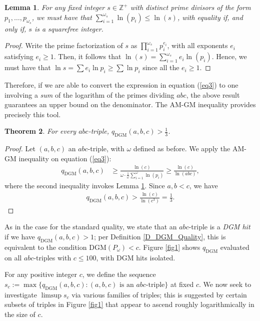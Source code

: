 \documentclass[11pt,letterpaper]{amsart}
\newtheorem{theorem}{Theorem}[section]
\newtheorem{lemma}[theorem]{Lemma}
\def\Z{\mathbb{Z}}
\def\Z{\mathbb{Z}}
\begin{document}
\begin{lemma}\label{L_ln_primes_DGM}
For any fixed integer $s\in\Z^{+}$ with distinct prime divisors of the form $p_1,\dots,p_{\omega_s}$, we must have that
$\sum_{i=1}^{\omega_s}\ln(p_i)\le\ln(s)$, with equality if, and only if, $s$ is a squarefree integer.
\end{lemma}
\begin{proof}
Write the prime factorization of $s$ as $\prod_{i = 1}^{\omega_s} p_i^{e_i}$, with all exponents $e_i$ satisfying $e_i \ge 1$. Then, it follows that $\ln(s) = \sum_{i = 1}^{\omega_s} e_i \ln(p_i)$. Hence, we must have that $\ln s=\sum e_i\ln p_i\ge\sum\ln p_i$ since all the $e_i \ge 1$.
\end{proof}
Therefore, if we are able to convert the expression in equation (\ref{eq3}) to one involving a \textit{sum} of the logarithm of the primes dividing $abc$, the above result guarantees an upper bound on the denominator. The AM-GM inequality provides precisely this tool.
\begin{theorem}\label{T_13}
For every $abc$-triple, $q_{\mathrm{DGM}}(a, b, c) > \tfrac{1}{3}$.
\end{theorem}
\begin{proof}
Let $(a, b, c)$ an $abc$-triple, with $\omega$ defined as before. We apply the AM-GM inequality on equation (\ref{eq3}):
\begin{align*}
q_{\mathrm{DGM}} (a, b, c) &\ge \frac{\ln(c)}{\omega \cdot \frac{1}{\omega} \sum_{i = 1}^{\omega} \ln(p_i)} \ge\frac{\ln(c)}{\ln(abc)},
\end{align*}
where the second inequality invokes Lemma \ref{L_ln_primes_DGM}. Since $a, b < c$, we have 
\begin{align*}
    q_{\mathrm{DGM}} (a, b, c) > \frac{\ln(c)}{\ln(c^3)} = \frac{1}{3}.
\end{align*}
\end{proof}

As in the case for the standard quality, we state that an $abc$-triple is a \textit{DGM hit} if we have $q_{\text{DGM}}(a, b, c) > 1$; per Definition \ref{D_DGM_Quality}, this is equivalent to the condition $\mathrm{DGM}(P_\omega)<c$. Figure \ref{fig1} shows $q_{\mathrm{DGM}}$ evaluated on all $abc$-triples with $c\le 100$, with DGM hits isolated. 

For any positive integer $c$, we define the sequence $s_c := \max\{q_{\mathrm{DGM}}(a,b,c):(a,b,c)\text{ is an }abc\text{-triple}\}$ at fixed $c$. We now seek to investigate $\limsup s_c$ via various families of triples; this is suggested by certain subsets of triples in Figure \ref{fig1} that appear to ascend roughly logarithmically in the size of $c$.
\end{document}
